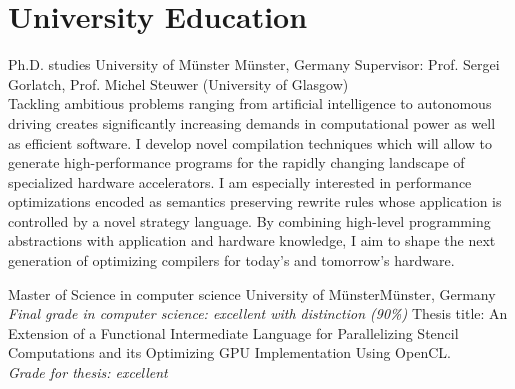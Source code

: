 \documentclass[11pt,a4paper]{moderncv}
\begin{document}
\nocite{*}
\makecvtitle

\section{University Education}
					{Ph.D. studies}
					{University of Münster}
					{Münster, Germany}{}
                    {Supervisor: Prof. Sergei Gorlatch, Prof. Michel Steuwer (University of Glasgow) \\
                    Tackling ambitious problems ranging from artificial intelligence to autonomous driving creates significantly increasing demands in computational power as well as efficient software.
                    I develop novel compilation techniques which will allow to generate high-performance programs for the rapidly changing landscape of specialized hardware accelerators.
                    I am especially interested in performance optimizations encoded as semantics preserving rewrite rules whose application is controlled by a novel strategy language.
                    By combining high-level programming abstractions with application and hardware knowledge, I aim to shape the next generation of optimizing compilers for today's and tomorrow's hardware.
					}

					{Master of Science in computer science}
					{University of Münster}{Münster, Germany}
					{\textit{Final grade in computer science: excellent with distinction (90\%)}}
					{Thesis title: An Extension of a Functional Intermediate Language for Parallelizing
					 Stencil Computations and its Optimizing GPU Implementation Using OpenCL.\\
					 \textit{Grade for thesis: excellent}
					}
\end{document}
